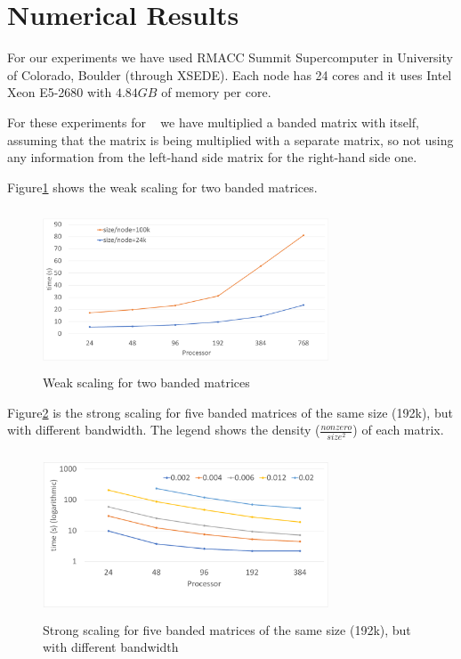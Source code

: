 \section{Numerical Results}
\label{sec:results}

For our experiments we have used RMACC Summit Supercomputer in University of Colorado, Boulder (through XSEDE). Each node has 24 cores and it uses Intel Xeon E5-2680 with $4.84GB$ of memory per core.

For these experiments for \mm~ we have multiplied a banded matrix with itself, assuming that the matrix is being multiplied with a separate matrix, so not using any information from the left-hand side matrix for the right-hand side one.

Figure\ref{fig:weak1} shows the weak scaling for two banded matrices.

\begin{figure}[tbh]
 \centering
 \includegraphics[width=8.5cm,height=4.8cm]{./figures/weak1.pdf}
 \caption{Weak scaling for two banded matrices}
 \label{fig:weak1}
\end{figure}

Figure\ref{fig:strong1} is the strong scaling for five banded matrices of the same size (192k), but with different bandwidth. The legend shows the density ($\frac{nonzero}{size^2}$) of each matrix.

\begin{figure}[tbh]
 \centering
 \includegraphics[width=8.5cm,height=4.9cm]{./figures/strong1.pdf}
 \caption{Strong scaling for five banded matrices of the same size (192k), but with different bandwidth}
 \label{fig:strong1}
\end{figure}

